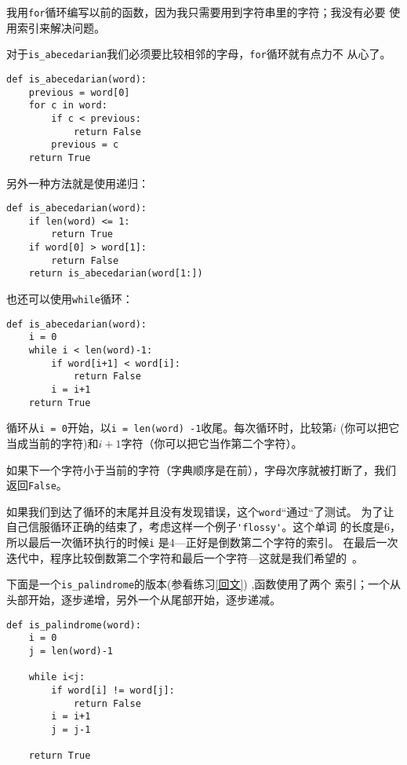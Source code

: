 
我用{\tt for}循环编写以前的函数，因为我只需要用到字符串里的字符；我没有必要
使用索引来解决问题。

对于\verb"is_abecedarian"我们必须要比较相邻的字母，{\tt for}循环就有点力不
从心了。




\beforeverb
\begin{verbatim}
def is_abecedarian(word):
    previous = word[0]
    for c in word:
        if c < previous:
            return False
        previous = c
    return True
\end{verbatim}
\afterverb

另外一种方法就是使用递归：

\beforeverb
\begin{verbatim}
def is_abecedarian(word):
    if len(word) <= 1:
        return True
    if word[0] > word[1]:
        return False
    return is_abecedarian(word[1:])
\end{verbatim}
\afterverb

也还可以使用{\tt while}循环：

\beforeverb
\begin{verbatim}
def is_abecedarian(word):
    i = 0
    while i < len(word)-1:
        if word[i+1] < word[i]:
            return False
        i = i+1
    return True
\end{verbatim}
\afterverb


循环从{\tt i = 0}开始，以{\tt i = len(word) -1}收尾。每次循环时，比较第$i$
(你可以把它当成当前的字符)和$i+1$字符（你可以把它当作第二个字符）。

如果下一个字符小于当前的字符（字典顺序是在前），字母次序就被打断了，我们
返回{\tt False}。

如果我们到达了循环的末尾并且没有发现错误，这个{\tt word}“通过“了测试。
为了让自己信服循环正确的结束了，考虑这样一个例子\verb"'flossy'"。这个单词
的长度是6，所以最后一次循环执行的时候{\tt i} 是4---正好是倒数第二个字符的索引。
在最后一次迭代中，程序比较倒数第二个字符和最后一个字符---这就是我们希望的~。


下面是一个\verb"is_palindrome"的版本(参看练习\ref{回文}) ,函数使用了两个
索引；一个从头部开始，逐步递增，另外一个从尾部开始，逐步递减。


\beforeverb
\begin{verbatim}
def is_palindrome(word):
    i = 0
    j = len(word)-1

    while i<j:
        if word[i] != word[j]:
            return False
        i = i+1
        j = j-1

    return True
\end{verbatim}
\afterverb

